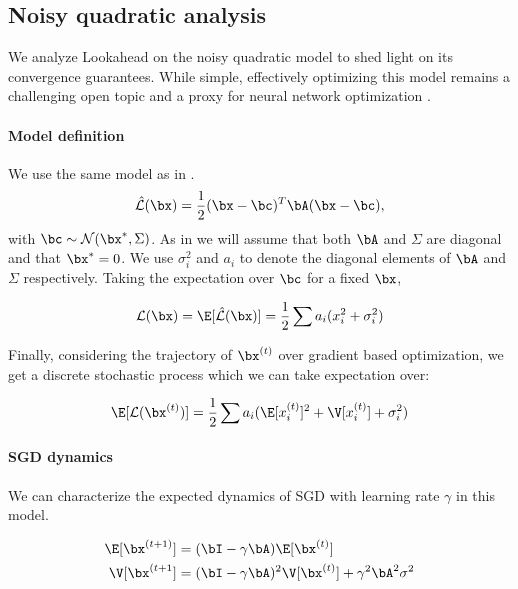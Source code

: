 \subsection{Noisy quadratic analysis}
\label{sec: noisyquadratic}

We analyze Lookahead on the noisy quadratic model to shed light on its convergence guarantees. While simple, effectively optimizing this model remains a challenging open topic and a proxy for neural network optimization \citep{schaul2013no, martens2015optimizing, wu2018understanding}.

\paragraph{Model definition} We use the same model as in \citet{wu2018understanding}. 
\begin{equation}
    \hat{\mathcal{L}}(\bx) = \frac{1}{2} (\bx - \bc)^T \bA (\bx - \bc),
\end{equation}
with $\bc \sim \mathcal{N}(\bx^*, \Sigma)$. As in \cite{wu2018understanding} we will assume that both $\bA$ and $\Sigma$ are diagonal and that $\bx^* = 0$. We use $\sigma^2_i$ and $a_i$ to denote the diagonal elements of $\bA$ and $\Sigma$ respectively. Taking the expectation over $\bc$ for a fixed $\bx$,

\begin{equation}
    \mathcal{L}(\bx) = \E[\hat{\mathcal{L}}(\bx)] = \frac{1}{2} \sum a_i (x_i^2 + \sigma_i^2) 
\end{equation}

Finally, considering the trajectory of $\bx^{(t)}$ over gradient based optimization, we get a discrete stochastic process which we can take expectation over:

\begin{equation}
    \E[\mathcal{L}(\bx^{(t)})] = \frac{1}{2}\sum a_i (\E[x_i^{(t)}]^2 + \V[x_i^{(t)}] + \sigma_i^2)
\end{equation}

\paragraph{SGD dynamics} We can characterize the expected dynamics of SGD with learning rate $\gamma$ in this model.

\begin{align}
    \E[\bx^{(t+1)}] &= (\bI - \gamma \bA) \E[\bx^{(t)}] \\
    \V[\bx^{(t+1}] &= (\bI - \gamma \bA)^2\V[\bx^{(t)}] + \gamma^2 \bA^2 \sigma^2
\end{align}

